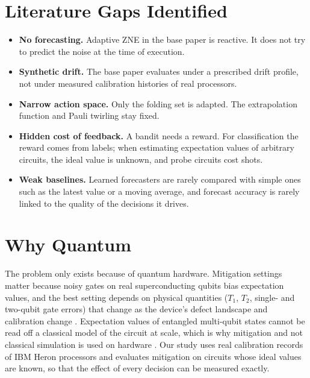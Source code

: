\documentclass[conference]{IEEEtran}
\begin{document}
\section{Literature Gaps Identified}
\begin{itemize}
\item \textbf{No forecasting.} Adaptive ZNE in the base paper \cite{rahman2026} is reactive. It does not try to predict the noise at the time of execution.
\item \textbf{Synthetic drift.} The base paper evaluates under a prescribed drift profile, not under measured calibration histories of real processors.
\item \textbf{Narrow action space.} Only the folding set is adapted. The extrapolation function and Pauli twirling stay fixed.
\item \textbf{Hidden cost of feedback.} A bandit needs a reward. For classification the reward comes from labels; when estimating expectation values of arbitrary circuits, the ideal value is unknown, and probe circuits cost shots.
\item \textbf{Weak baselines.} Learned forecasters are rarely compared with simple ones such as the latest value or a moving average, and forecast accuracy is rarely linked to the quality of the decisions it drives.
\end{itemize}

\section{Why Quantum}
The problem only exists because of quantum hardware. Mitigation settings matter because noisy gates on real superconducting qubits bias expectation values, and the best setting depends on physical quantities ($T_1$, $T_2$, single- and two-qubit gate errors) that change as the device's defect landscape and calibration change \cite{klimov2018}. Expectation values of entangled multi-qubit states cannot be read off a classical model of the circuit at scale, which is why mitigation and not classical simulation is used on hardware \cite{kim2023}. Our study uses real calibration records of IBM Heron processors and evaluates mitigation on circuits whose ideal values are known, so that the effect of every decision can be measured exactly.
\end{document}

